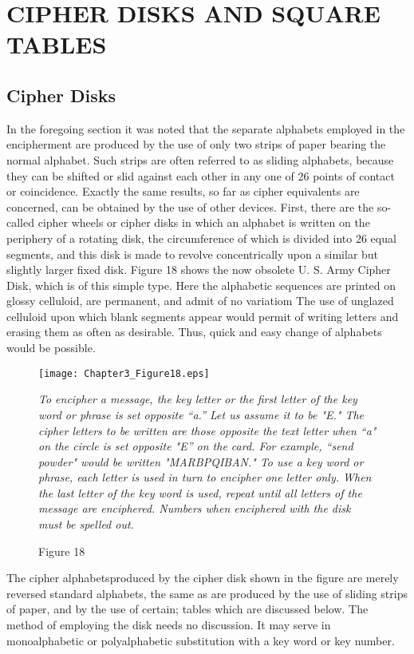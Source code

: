 \section{CIPHER DISKS AND SQUARE TABLES}
\subsection{Cipher Disks}

\mypara In the foregoing section it was noted that the separate alphabets
employed in the encipherment are produced by the use of only two strips
of paper bearing the normal alphabet. Such strips are often referred to
as sliding alphabets, because they can be shifted or slid against each other
in any one of 26 points of contact or coincidence. Exactly the same
results, so far as cipher equivalents are concerned, can be obtained by the
use of other devices. First, there are the so-called cipher wheels or cipher
disks in which an alphabet is written on the periphery of a rotating disk,
the circumference of which is divided into 26 equal segments, and this
disk is made to revolve concentrically upon a similar but slightly larger
ﬁxed disk. Figure 18 shows the now obsolete U. S. Army Cipher Disk,
which is of this simple type. Here the alphabetic sequences are printed
on glossy celluloid, are permanent, and admit of no variatiom The
use of unglazed celluloid upon which blank segments appear would
permit of writing letters and erasing them as often as desirable. Thus,
quick and easy change of alphabets would be possible.

\begin{figure}[h]
 \centering
 \texttt{[image: Chapter3\_Figure18.eps]}

        {\centering
        \small{\textit{To encipher a message, the key letter or the ﬁrst letter of the
key word or phrase is set opposite “a.” Let us assume it
to be "E." The cipher letters to be written are those
opposite the text letter when “a" on the circle is set
opposite "E” on the card. For example, “send powder"
would be written "MARBPQIBAN." To use a key word
or phrase, each letter is used in turn to encipher one letter
only. When the last letter of the key word is used, repeat
until all letters of the message are enciphered. Numbers
when enciphered with the disk must be spelled out.}}
\par }
 \caption{Figure 18}
\end{figure}

\mypara The cipher alphabetsproduced by the cipher disk shown in the
ﬁgure are merely reversed standard alphabets, the same as are produced
by the use of sliding strips of paper, and by the use of certain; tables
which are discussed below. The method of employing the disk needs no
discussion. It may serve in monoalphabetic or polyalphabetic substitution
with a key word or key number.

